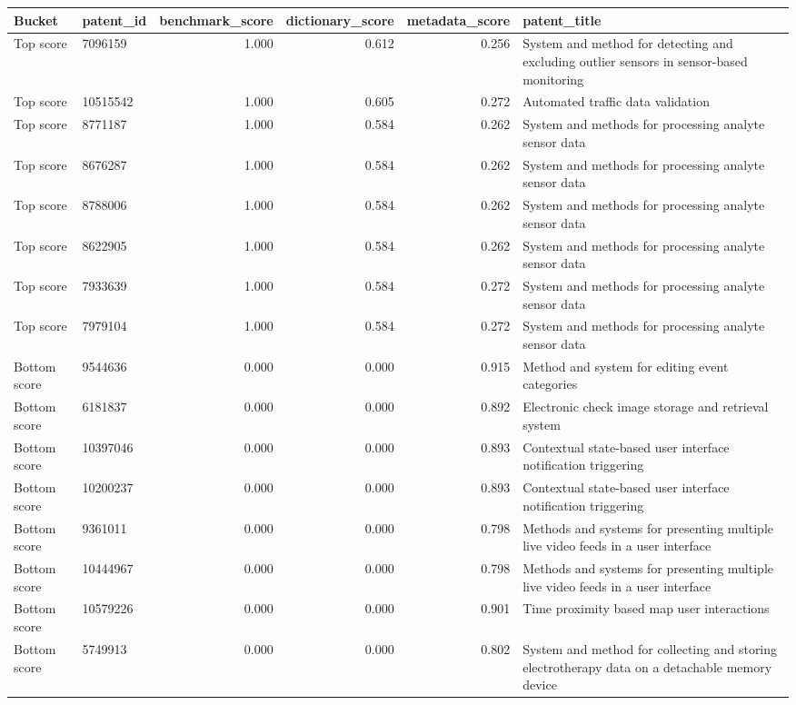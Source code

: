 \begin{tabular}{llrrrl}
\toprule
Bucket & patent_id & benchmark_score & dictionary_score & metadata_score & patent_title \\
\midrule
Top score & 7096159 & 1.000 & 0.612 & 0.256 & System and method for detecting and excluding outlier sensors in sensor-based monitoring \\
Top score & 10515542 & 1.000 & 0.605 & 0.272 & Automated traffic data validation \\
Top score & 8771187 & 1.000 & 0.584 & 0.262 & System and methods for processing analyte sensor data \\
Top score & 8676287 & 1.000 & 0.584 & 0.262 & System and methods for processing analyte sensor data \\
Top score & 8788006 & 1.000 & 0.584 & 0.262 & System and methods for processing analyte sensor data \\
Top score & 8622905 & 1.000 & 0.584 & 0.262 & System and methods for processing analyte sensor data \\
Top score & 7933639 & 1.000 & 0.584 & 0.272 & System and methods for processing analyte sensor data \\
Top score & 7979104 & 1.000 & 0.584 & 0.272 & System and methods for processing analyte sensor data \\
Bottom score & 9544636 & 0.000 & 0.000 & 0.915 & Method and system for editing event categories \\
Bottom score & 6181837 & 0.000 & 0.000 & 0.892 & Electronic check image storage and retrieval system \\
Bottom score & 10397046 & 0.000 & 0.000 & 0.893 & Contextual state-based user interface notification triggering \\
Bottom score & 10200237 & 0.000 & 0.000 & 0.893 & Contextual state-based user interface notification triggering \\
Bottom score & 9361011 & 0.000 & 0.000 & 0.798 & Methods and systems for presenting multiple live video feeds in a user interface \\
Bottom score & 10444967 & 0.000 & 0.000 & 0.798 & Methods and systems for presenting multiple live video feeds in a user interface \\
Bottom score & 10579226 & 0.000 & 0.000 & 0.901 & Time proximity based map user interactions \\
Bottom score & 5749913 & 0.000 & 0.000 & 0.802 & System and method for collecting and storing electrotherapy data on a detachable memory device \\

\end{tabular}
